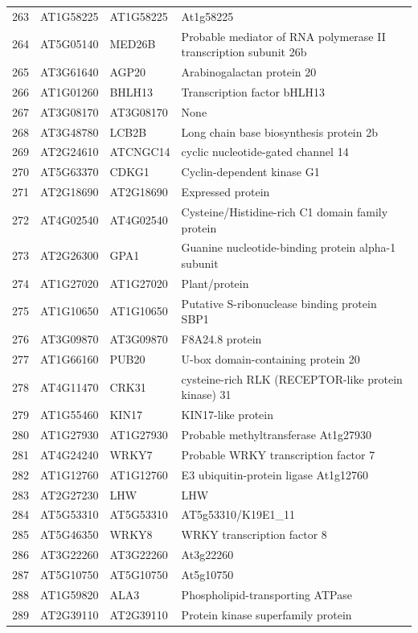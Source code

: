 \documentclass[11pt]{article}
\begin{document}
\begin{center}
\begin{tabular}{rlll}
263 & AT1G58225 & AT1G58225 & At1g58225\\
264 & AT5G05140 & MED26B & Probable mediator of RNA polymerase II transcription subunit 26b\\
265 & AT3G61640 & AGP20 & Arabinogalactan protein 20\\
266 & AT1G01260 & BHLH13 & Transcription factor bHLH13\\
267 & AT3G08170 & AT3G08170 & None\\
268 & AT3G48780 & LCB2B & Long chain base biosynthesis protein 2b\\
269 & AT2G24610 & ATCNGC14 & cyclic nucleotide-gated channel 14\\
270 & AT5G63370 & CDKG1 & Cyclin-dependent kinase G1\\
271 & AT2G18690 & AT2G18690 & Expressed protein\\
272 & AT4G02540 & AT4G02540 & Cysteine/Histidine-rich C1 domain family protein\\
273 & AT2G26300 & GPA1 & Guanine nucleotide-binding protein alpha-1 subunit\\
274 & AT1G27020 & AT1G27020 & Plant/protein\\
275 & AT1G10650 & AT1G10650 & Putative S-ribonuclease binding protein SBP1\\
276 & AT3G09870 & AT3G09870 & F8A24.8 protein\\
277 & AT1G66160 & PUB20 & U-box domain-containing protein 20\\
278 & AT4G11470 & CRK31 & cysteine-rich RLK (RECEPTOR-like protein kinase) 31\\
279 & AT1G55460 & KIN17 & KIN17-like protein\\
280 & AT1G27930 & AT1G27930 & Probable methyltransferase At1g27930\\
281 & AT4G24240 & WRKY7 & Probable WRKY transcription factor 7\\
282 & AT1G12760 & AT1G12760 & E3 ubiquitin-protein ligase At1g12760\\
283 & AT2G27230 & LHW & LHW\\
284 & AT5G53310 & AT5G53310 & AT5g53310/K19E1\_11\\
285 & AT5G46350 & WRKY8 & WRKY transcription factor 8\\
286 & AT3G22260 & AT3G22260 & At3g22260\\
287 & AT5G10750 & AT5G10750 & At5g10750\\
288 & AT1G59820 & ALA3 & Phospholipid-transporting ATPase\\
289 & AT2G39110 & AT2G39110 & Protein kinase superfamily protein\\

\end{tabular}
\end{center}
\end{document}

